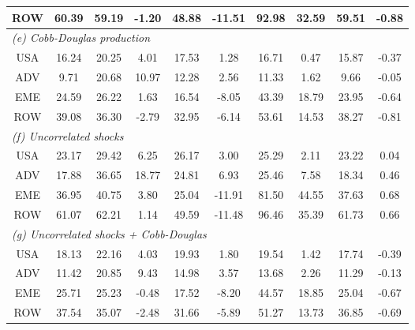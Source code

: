 \begin{table}[p]
\begin{center}
\begin{tabular}{cccccccccc}
ROW&60.39&59.19&-1.20&48.88&-11.51&92.98&32.59&59.51&-0.88\\
\midrule
\multicolumn{10}{l}{\textit{(e) Cobb-Douglas production}}\\
USA&16.24&20.25&4.01&17.53&1.28&16.71&0.47&15.87&-0.37\\
ADV&9.71&20.68&10.97&12.28&2.56&11.33&1.62&9.66&-0.05\\
EME&24.59&26.22&1.63&16.54&-8.05&43.39&18.79&23.95&-0.64\\
ROW&39.08&36.30&-2.79&32.95&-6.14&53.61&14.53&38.27&-0.81\\
\midrule
\multicolumn{10}{l}{\textit{(f) Uncorrelated shocks}}\\
USA&23.17&29.42&6.25&26.17&3.00&25.29&2.11&23.22&0.04\\
ADV&17.88&36.65&18.77&24.81&6.93&25.46&7.58&18.34&0.46\\
EME&36.95&40.75&3.80&25.04&-11.91&81.50&44.55&37.63&0.68\\
ROW&61.07&62.21&1.14&49.59&-11.48&96.46&35.39&61.73&0.66\\
\midrule
\multicolumn{10}{l}{\textit{(g) Uncorrelated shocks + Cobb-Douglas}}\\
USA&18.13&22.16&4.03&19.93&1.80&19.54&1.42&17.74&-0.39\\
ADV&11.42&20.85&9.43&14.98&3.57&13.68&2.26&11.29&-0.13\\
EME&25.71&25.23&-0.48&17.52&-8.20&44.57&18.85&25.04&-0.67\\
ROW&37.54&35.07&-2.48&31.66&-5.89&51.27&13.73&36.85&-0.69\\
\bottomrule
\end{tabular}
\normalsize
\end{center}
\end{table}
